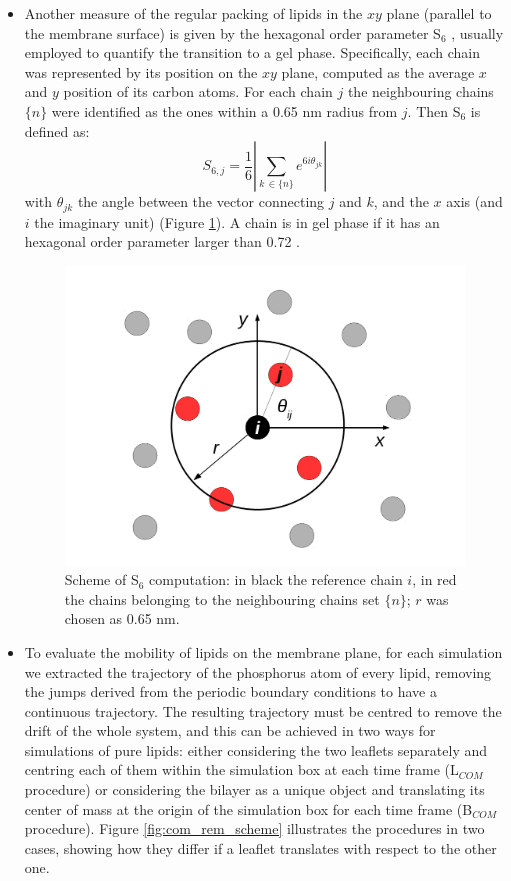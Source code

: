\begin{itemize}
\item Another measure of the regular packing of lipids in the $xy$ plane (parallel to the membrane surface) is given by the hexagonal order parameter S$_6$ \citep{Uppulury2015}, usually employed to quantify the transition to a gel phase. Specifically, each chain was represented by its position on the $xy$ plane, computed as the average $x$ and $y$ position of its carbon atoms.
%
For each chain $j$ the neighbouring chains $\{n\}$ were identified as the ones within a 0.65 nm radius from $j$. Then S$_6$ is defined as:
\begin{equation}
S_{6,j} = \frac{1}{6} \left| \sum_{k \,\in \{n\}} e^{6i\theta_{jk}} \right|
\end{equation}
with $\theta_{jk}$ the angle between the vector connecting $j$ and $k$, and the $x$ axis (and $i$ the imaginary unit) (Figure \ref{fig:S6_theory}). A chain is in gel phase if it has an hexagonal order parameter larger than 0.72 \citep{Uppulury2015}.
%
\begin{figure}[t!]
\centering
\includegraphics[width=0.55\linewidth]{3results_capsule/pics/s6_theory.pdf}
\caption[Scheme of S$_6$ computation]{Scheme of S$_6$ computation: in black the reference chain $i$, in red the chains belonging to the neighbouring chains set $\{n\}$; $r$ was chosen as 0.65 nm.} \label{fig:S6_theory}
\end{figure}

\item To evaluate the mobility of lipids on the membrane plane, for each simulation we extracted the trajectory of the phosphorus atom of every lipid, removing the jumps derived from the periodic boundary conditions to have a continuous trajectory. The resulting trajectory must be centred to remove the drift of the whole system, and this can be achieved in two ways for simulations of pure lipids: either considering the two leaflets separately and centring each of them within the simulation box at each time frame (L$_{COM}$ procedure) or considering the bilayer as a unique object and translating its center of mass at the origin of the simulation box for each time frame (B$_{COM}$ procedure). Figure \ref{fig:com_rem_scheme} illustrates the procedures in two cases, showing how they differ if a leaflet translates with respect to the other one.


\end{itemize}
